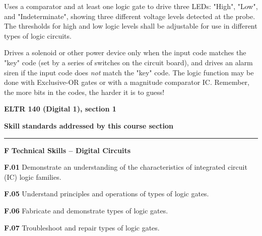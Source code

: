 \vskip 10pt

\noindent
{} Uses a comparator and at least one logic gate to drive three LEDs: "High", "Low", and "Indeterminate", showing three different voltage levels detected at the probe.  The thresholds for high and low logic levels shall be adjustable for use in different types of logic circuits.

\vskip 10pt

\noindent
{} Drives a solenoid or other power device only when the input code matches the "key" code (set by a series of switches on the circuit board), and drives an alarm siren if the input code does {\it not} match the "key" code.  The logic function may be done with Exclusive-OR gates or with a magnitude comparator IC.  Remember, the more bits in the codes, the harder it is to guess!

\vskip 10pt


\vfil \eject

\centerline{\bf ELTR 140 (Digital 1), section 1} \bigskip 
 
\vskip 10pt

\noindent
{\bf Skill standards addressed by this course section}

\vskip 5pt

\hrule \vskip 10pt
\noindent
{}

\vskip 5pt

\medskip
\item{\bf F} {\bf Technical Skills -- Digital Circuits}
\item{\bf F.01} Demonstrate an understanding of the characteristics of integrated circuit (IC) logic families.
\item{\bf F.05} Understand principles and operations of types of logic gates.
\item{\bf F.06} Fabricate and demonstrate types of logic gates.
\item{\bf F.07} Troubleshoot and repair types of logic gates.
\medskip

\vskip 5pt

